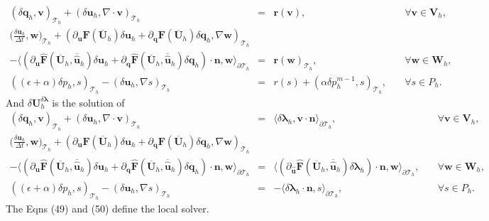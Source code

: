 \documentclass[11pt]{article}
\begin{document}
\begin{equation}
\begin{array}{rcll}
(\delta \bm{q}_h, \bm{v})_{\mathcal{T}_h} + (\delta \bm{u}_h, \nabla \cdot \bm{v})_{\mathcal{T}_h}   & = & \bm{r}(\bm{v}), & \quad \forall \bm{v} \in \bm{V}_h, \\[2ex] 
\displaystyle \Big(\frac{\delta \bm{u}_h}{\Delta t}, \bm{w} \Big)_{\mathcal{T}_h} + (\partial_{\bm{u}} \bm{F} (\overline{\bm{U}}_h) \delta \bm{u}_h + \partial_{\bm{q}} \bm{F} (\overline{\bm{U}}_h) \delta \bm{q}_h, \nabla \bm{w})_{\mathcal{T}_h} & & \\[2ex]
- \langle (\partial_{\bm{u}} \widehat{\bm{F}} (\overline{\bm{U}}_h,\overline{\widehat{\bm{u}}}_h) \delta \bm{u}_h + \partial_{{\bm{q}}} \widehat{\bm{F}} (\overline{\bm{U}}_h,\overline{\widehat{\bm{u}}}_h) \delta {\bm{q}}_h) \cdot \bm{n}, \bm{w} \rangle_{\partial \mathcal{T}_h}  & = &  \bm{r}(\bm{w})_{\mathcal{T}_h},  & \quad \forall \bm{w} \in \bm{W}_h, \\[2ex]
 ((\epsilon + \alpha) \delta p_h, s)_{\mathcal{T}_h} - (\delta \bm{u}_h, \nabla s)_{\mathcal{T}_h}   & = & r(s) +  (\alpha \delta p_h^{m-1}, s)_{\mathcal{T}_h}, & \quad \forall s \in P_h .
\end{array}
\end{equation}
And $\delta \bm{U}_h^{\delta \bm{\lambda}}$ is the solution of
\begin{equation}
\begin{array}{rcll}
(\delta \bm{q}_h, \bm{v})_{\mathcal{T}_h} + (\delta \bm{u}_h, \nabla \cdot \bm{v})_{\mathcal{T}_h}   & = & \langle \delta {\bm{\lambda}}_h, \bm{v} \cdot \bm{n} \rangle_{\partial \mathcal{T}_h}, & \quad \forall \bm{v} \in \bm{V}_h, \\[2ex] 
\displaystyle \Big(\frac{\delta \bm{u}_h}{\Delta t}, \bm{w} \Big)_{\mathcal{T}_h} + (\partial_{\bm{u}} \bm{F} (\overline{\bm{U}}_h) \delta \bm{u}_h + \partial_{\bm{q}} \bm{F} (\overline{\bm{U}}_h) \delta \bm{q}_h, \nabla \bm{w})_{\mathcal{T}_h} & & \\[2ex]
- \langle (\partial_{\bm{u}} \widehat{\bm{F}} (\overline{\bm{U}}_h,\overline{\widehat{\bm{u}}}_h) \delta \bm{u}_h + \partial_{{\bm{q}}} \widehat{\bm{F}} (\overline{\bm{U}}_h,\overline{\widehat{\bm{u}}}_h) \delta {\bm{q}}_h) \cdot \bm{n}, \bm{w} \rangle_{\partial \mathcal{T}_h}  & = &  \langle (\partial_{\widehat{\bm{u}}} \widehat{\bm{F}} (\overline{\bm{U}}_h,  \overline{\widehat{\bm{u}}}_h) \delta {\bm{\lambda}}_h) \cdot \bm{n}, \bm{w} \rangle_{\partial \mathcal{T}_h} ,  & \quad \forall \bm{w} \in \bm{W}_h, \\[2ex]
 ((\epsilon + \alpha) \delta p_h, s)_{\mathcal{T}_h} - (\delta \bm{u}_h, \nabla s)_{\mathcal{T}_h}   & = &  -\langle \delta {\bm{\lambda}}_h \cdot \bm{n},s \rangle_{\partial \mathcal{T}_h} , & \quad \forall s \in P_h .
\end{array}
\end{equation}
The Eqns (49) and (50) define the local solver.
\end{document}
